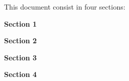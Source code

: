 This document consist in four sections:\par

\textbf{Section 1}\par
\textbf{Section 2}\par
\textbf{Section 3}\par
\textbf{Section 4}
